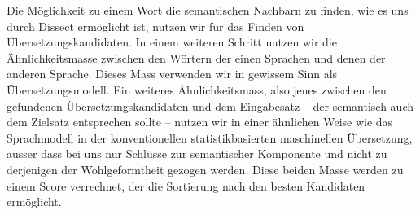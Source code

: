 \documentclass[11pt,twoside,openright]{mpreport}
\begin{document}
Die Möglichkeit zu einem Wort die semantischen Nachbarn zu finden, wie es uns durch Dissect ermöglicht ist, nutzen wir für das Finden von Übersetzungskandidaten. In einem weiteren Schritt nutzen wir die Ähnlichkeitsmasse zwischen den Wörtern der einen Sprachen und denen der anderen Sprache. Dieses Mass verwenden wir in gewissem Sinn als Übersetzungsmodell.
Ein weiteres Ähnlichkeitsmass, also jenes zwischen den gefundenen Übersetzungskandidaten und dem Eingabesatz -- der semantisch auch dem Zielsatz entsprechen sollte -- nutzen wir in einer ähnlichen Weise wie das Sprachmodell in der konventionellen statistikbasierten maschinellen Übersetzung, ausser dass bei uns nur Schlüsse zur semantischer Komponente und nicht zu derjenigen der Wohlgeformtheit gezogen werden. Diese beiden Masse werden zu einem Score verrechnet, der die Sortierung nach den besten Kandidaten ermöglicht.


\end{document}
